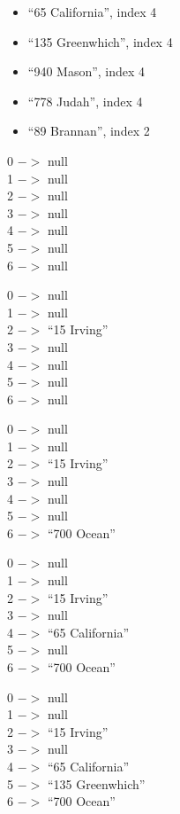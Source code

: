 \documentclass[10pt]{article}
\begin{document}
\begin{enumerate}
\begin{itemize}
				\item ``65 California'', index 4
				
				\item ``135 Greenwhich'', index 4
				
				\item ``940 Mason'', index 4
				
				\item ``778 Judah'', index 4
				
				\item ``89 Brannan'', index 2
			\end{itemize}
			
			\vspace{0.5cm}
			0 $->$ null\\
			1 $->$ null\\
			2 $->$ null\\
			3 $->$ null\\
			4 $->$ null\\
			5 $->$ null\\
			6 $->$ null
			
			\vspace{0.5cm}
			0 $->$ null\\
			1 $->$ null\\
			2 $->$ ``15 Irving''\\
			3 $->$ null\\
			4 $->$ null\\
			5 $->$ null\\
			6 $->$ null
			
			\vspace{0.5cm}
			0 $->$ null\\
			1 $->$ null\\
			2 $->$ ``15 Irving''\\
			3 $->$ null\\
			4 $->$ null\\
			5 $->$ null\\
			6 $->$ ``700 Ocean''
			
			\vspace{0.5cm}
			0 $->$ null\\
			1 $->$ null\\
			2 $->$ ``15 Irving''\\
			3 $->$ null\\
			4 $->$ ``65 California''\\
			5 $->$ null\\
			6 $->$ ``700 Ocean''
			
			\vspace{0.5cm}
			0 $->$ null\\
			1 $->$ null\\
			2 $->$ ``15 Irving''\\
			3 $->$ null\\
			4 $->$ ``65 California''\\
			5 $->$ ``135 Greenwhich''\\
			6 $->$ ``700 Ocean''
			

\end{enumerate}
\end{document}
